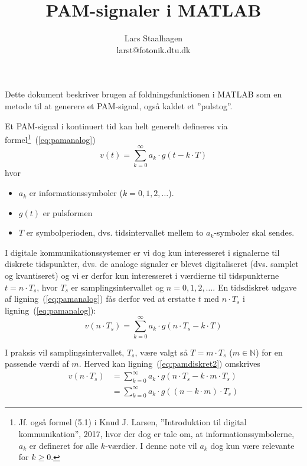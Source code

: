 \documentclass[dvips,11pt,a4paper]{article}
\title{PAM-signaler i MATLAB}
\author{Lars Staalhagen\\{\small larst@fotonik.dtu.dk}}
\date{}
\begin{document}
\maketitle

\noindent{}Dette dokument beskriver brugen af foldningsfunktionen i MATLAB som en metode til at generere et PAM-signal, også kaldet et ''pulstog''.

Et PAM-signal i kontinuert tid kan helt generelt defineres via formel\footnote{Jf. også formel (5.1) i Knud J. Larsen, ''Introduktion til digital kommunikation'', 2017, hvor der dog er tale om, at informationssymbolerne, $a_k$ er defineret for alle $k$-værdier. I denne note vil $a_k$ dog kun være relevante for $k\ge{}0$.}~(\ref{eq:pamanalog})
\begin{equation}
v(t)=\sum_{k=0}^{\infty} a_{k} \cdot g(t-k \cdot T)
\label{eq:pamanalog}
\end{equation}
hvor
\begin{itemize}
\item $a_k$ er informationssymboler ($k=0,1,2,\ldots$).
\item $g(t)$ er pulsformen
\item $T$ er symbolperioden, dvs. tidsintervallet mellem to $a_k$-symboler skal sendes.
\end{itemize}

\noindent{}I digitale kommunikationssystemer er vi dog kun interesseret i signalerne til diskrete tidspunkter, dvs. de analoge signaler er blevet digitaliseret (dvs. samplet og kvantiseret) og vi er derfor kun interesseret i værdierne til tidspunkterne $t = n \cdot T_{s}$, hvor $T_s$ er samplingsintervallet og $n = 0,1,2,\ldots$. En tidsdiskret udgave af ligning~(\ref{eq:pamanalog}) fås derfor ved at erstatte $t$ med $n \cdot T_s$ i ligning~(\ref{eq:pamanalog}):
\begin{equation}
v(n \cdot T_{s})=\sum_{k=0}^{\infty} a_{k} \cdot g(n \cdot T_{s}-k \cdot T)
\label{eq:pamdiskret2}
\end{equation}

\noindent{}I praksis vil samplingsintervallet, $T_s$, være valgt så $T = m \cdot T_s$ ($m \in \mathbb{N}$) for en passende værdi af $m$. Herved kan ligning~(\ref{eq:pamdiskret2}) omskrives
\begin{align}
v(n \cdot T_{s}) &= \sum_{k=0}^{\infty} a_{k} \cdot g(n \cdot T_{s}-k \cdot m \cdot T_s) \\
 &= \sum_{k=0}^{\infty} a_{k} \cdot g((n - k \cdot m) \cdot T_{s}) 
\end{align}
\end{document}
